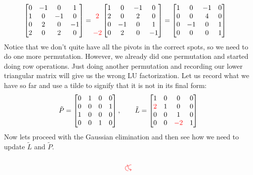 \documentclass[reqno]{amsart}
\theoremstyle{definition}
\begin{document}
\begin{itemize}
\begin{equation*}
\begin{matrix}
\end{matrix}
\begin{bmatrix}
0 & -1 & 0 & 1\\
1 & 0 & -1 & 0\\
0 & 2 & 0 & -1\\
2 & 0 & 2 & 0
\end{bmatrix} = \begin{matrix}
\\
{\color{red}2}\\
\\
{\color{red}-2}
\end{matrix}\begin{bmatrix}
1 & 0 & -1 & 0\\
2 & 0 & 2 & 0\\
0 & -1 & 0 & 1\\
0 & 2 & 0 & -1
\end{bmatrix} = \begin{bmatrix}
1 & 0 & -1 & 0\\
0 & 0 & 4 & 0\\
0 & -1 & 0 & 1\\
0 & 0 & 0 & 1
\end{bmatrix}
\end{equation*}
%
Notice that we don't quite have all the pivots in the correct spots, so we need to do one more permutation.  However, we already did one permutation and started doing row operations.  Just doing another permutation and recording our lower triangular matrix will give us the wrong LU factorization.  Let us record what we have so far and use a tilde to signify that it is not in its final form:
%
\begin{equation*}
\tilde{P} = \begin{bmatrix}
0 & 1 & 0 & 0\\
0 & 0 & 0 & 1\\
1 & 0 & 0 & 0\\
0 & 0 & 1 & 0
\end{bmatrix},\qquad
\tilde{L} = \begin{bmatrix}
1 & 0 & 0 & 0\\
{\color{red}2} & 1 & 0 & 0\\
0 & 0 & 1 & 0\\
0 & 0 & {\color{red}-2} & 1
\end{bmatrix}
\end{equation*}
%
Now lets proceed with the Gaussian elimination and then see how we need to update $\tilde{L}$ and $\tilde{P}$.
%
\begin{equation*}
\begin{matrix}
\\
\curvearrowup\curvearrowdown\\
\\


\end{matrix}
\end{equation*}
\end{itemize}
\end{document}
